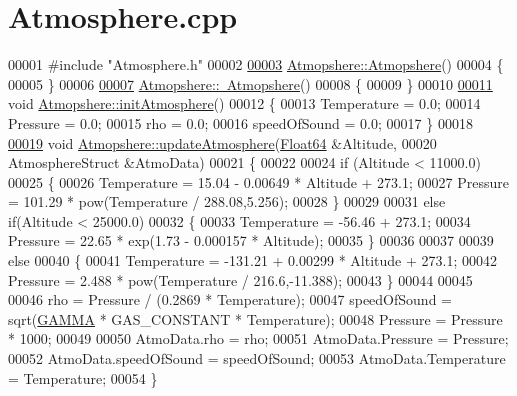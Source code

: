\hypertarget{_atmosphere_8cpp_source}{}\section{Atmosphere.\+cpp}
\label{_atmosphere_8cpp_source}

\begin{DoxyCode}
00001 \textcolor{preprocessor}{#include "Atmosphere.h"}
00002 
\hyperlink{group___atmosphere_a77ca553d3c4e855dd921a451d65cc313}{00003} \hyperlink{group___atmosphere_a77ca553d3c4e855dd921a451d65cc313}{Atmopshere::Atmopshere}()
00004 \{
00005 \}
00006 
\hyperlink{group___atmosphere_ac7815ca8008ed54dc758f2bf7a6104f7}{00007} \hyperlink{group___atmosphere_ac7815ca8008ed54dc758f2bf7a6104f7}{Atmopshere::~Atmopshere}()
00008 \{
00009 \}
00010 
\hyperlink{group___atmosphere_a6e1d5763fbb6631784c99ee3c88911bd}{00011} \textcolor{keywordtype}{void} \hyperlink{group___atmosphere_a6e1d5763fbb6631784c99ee3c88911bd}{Atmopshere::initAtmosphere}()
00012 \{
00013     Temperature     = 0.0;  
00014     Pressure        = 0.0;       
00015     rho             = 0.0;          
00016     speedOfSound    = 0.0;   
00017 \}
00018 
\hyperlink{group___atmosphere_a2bd97471d32725d6196ee6816ea36c99}{00019} \textcolor{keywordtype}{void} \hyperlink{group___atmosphere_a2bd97471d32725d6196ee6816ea36c99}{Atmopshere::updateAtmosphere}(\hyperlink{group___tools_ga3f1431cb9f76da10f59246d1d743dc2c}{Float64} &Altitude, 
00020                                   AtmosphereStruct &AtmoData)
00021 \{
00022 
00024     \textcolor{keywordflow}{if} (Altitude < 11000.0)
00025     \{
00026         Temperature = 15.04 - 0.00649 * Altitude + 273.1;
00027         Pressure = 101.29 * pow(Temperature / 288.08,5.256);
00028     \}
00029 
00031     \textcolor{keywordflow}{else} \textcolor{keywordflow}{if}(Altitude < 25000.0)
00032     \{
00033                 Temperature = -56.46 + 273.1;
00034                 Pressure = 22.65 * exp(1.73 - 0.000157 * Altitude);
00035     \}
00036 
00037 
00039     \textcolor{keywordflow}{else}
00040     \{ 
00041             Temperature = -131.21 + 0.00299 * Altitude + 273.1;
00042             Pressure = 2.488 * pow(Temperature / 216.6,-11.388);
00043     \}
00044         
00045 
00046             rho          = Pressure / (0.2869 * Temperature);           
00047             speedOfSound = sqrt(\hyperlink{group___tools_ga6e7b8e4a71fb3f6d37718ac5d614f560}{GAMMA} * GAS\_CONSTANT * Temperature);
00048             Pressure     = Pressure * 1000;
00049 
00050             AtmoData.rho = rho;
00051             AtmoData.Pressure = Pressure;
00052             AtmoData.speedOfSound = speedOfSound;
00053             AtmoData.Temperature = Temperature;
00054 \}
\end{DoxyCode}
